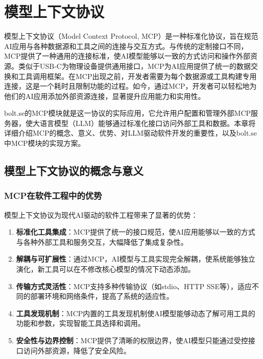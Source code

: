 
\chapter{模型上下文协议}

模型上下文协议（Model Context Protocol, MCP）是一种标准化协议，旨在规范AI应用与各种数据源和工具之间的连接与交互方式。与传统的定制接口不同，MCP提供了一种通用的连接标准，使AI模型能够以一致的方式访问和操作外部资源。类似于USB-C为物理设备提供通用接口，MCP为AI应用提供了统一的数据交换和工具调用框架。在MCP出现之前，开发者需要为每个数据源或工具构建专用连接，这是一个耗时且限制功能的过程。如今，通过MCP，开发者可以轻松地为他们的AI应用添加外部资源连接，显著提升应用能力和实用性\cite{mcpspec2023}。

bolt.se的MCP模块就是这一协议的实际应用，它允许用户配置和管理外部MCP服务器，使大语言模型（LLM）能够通过标准化接口访问外部工具和数据。本章将详细介绍MCP的概念、意义、优势、对LLM驱动软件开发的重要性，以及bolt.se中MCP模块的实现方案。

\section{模型上下文协议的概念与意义}

\subsection{MCP在软件工程中的优势}
模型上下文协议为现代AI驱动的软件工程带来了显著的优势：

\begin{enumerate}
  \item \textbf{标准化工具集成}：MCP提供了统一的接口规范，使AI应用能够以一致的方式与各种外部工具和服务交互，大幅降低了集成复杂性。
  
  \item \textbf{解耦与可扩展性}：通过MCP，AI模型与工具实现完全解耦，使系统能够独立演化，新工具可以在不修改核心模型的情况下动态添加。
  
  \item \textbf{传输方式灵活性}：MCP支持多种传输协议（如stdio、HTTP SSE等），适应不同的部署环境和网络条件，提高了系统的适应性。
  
  \item \textbf{工具发现机制}：MCP内置的工具发现机制使AI模型能够动态了解可用工具的功能和参数，实现智能工具选择和调用。
  
  \item \textbf{安全性与边界控制}：MCP提供了清晰的权限边界，使AI模型只能通过受控接口访问外部资源，降低了安全风险。
\end{enumerate}

